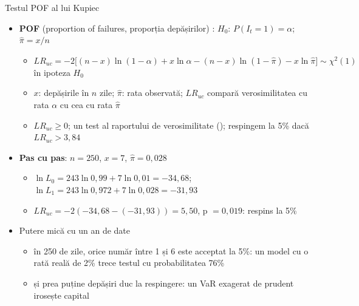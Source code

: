 \begin{frame}{Testul POF al lui Kupiec}
\itemsize{\footnotesize}
\begin{itemize}
    \item \textbf{POF} (proportion of failures, proporția depășirilor) : $H_0$: $P(I_t = 1) = \alpha$; $\hat\pi = x/n$
    \begin{itemize}
        \item $LR_{uc} = -2\big[(n - x)\ln(1 - \alpha) + x\ln\alpha - (n - x)\ln(1 - \hat\pi) - x\ln\hat\pi\big] \sim \chi^2(1)$ în ipoteza $H_0$
        \item $x$: depășirile în $n$ zile; $\hat\pi$: rata observată; $LR_{uc}$ compară verosimilitatea cu rata $\alpha$ cu cea cu rata $\hat\pi$
        \item $LR_{uc} \ge 0$; un test al raportului de verosimilitate (); respingem la 5\% dacă $LR_{uc} > 3{,}84$
    \end{itemize}
    \item \textbf{Pas cu pas}: $n = 250$, $x = 7$, $\hat\pi = 0{,}028$
    \begin{itemize}
        \item $\ln L_0 = 243\ln 0{,}99 + 7\ln 0{,}01 = -34{,}68$; $\ln L_1 = 243\ln 0{,}972 + 7\ln 0{,}028 = -31{,}93$
        \item $LR_{uc} = -2(-34{,}68 - (-31{,}93)) = 5{,}50$, p $= 0{,}019$: respins la 5\%
    \end{itemize}
    \item Putere mică cu un an de date
    \begin{itemize}
        \item în 250 de zile, orice număr între 1 și 6 este acceptat la 5\%: un model cu o rată reală de 2\% trece testul cu probabilitatea 76\%
        \item și prea puține depășiri duc la respingere: un VaR exagerat de prudent irosește capital
    \end{itemize}
\end{itemize}
\end{frame}

